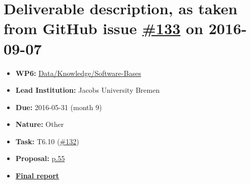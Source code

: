 \section*{\texorpdfstring{Deliverable description, as taken from GitHub
issue
\href{https://github.com/OpenDreamKit/OpenDreamKit/issues/133}{\#133} on
2016-09-07}{Deliverable description, as taken from GitHub issue \#133 on 2016-09-07}}\label{deliverable-description-as-taken-from-github-issues-133-on-2016-09-07}

\begin{itemize}
\tightlist
\item
  \textbf{WP6:}
  \href{https://github.com/OpenDreamKit/OpenDreamKit/tree/master/WP6}{Data/Knowledge/Software-Bases}
\item
  \textbf{Lead Institution:} Jacobs University Bremen
\item
  \textbf{Due:} 2016-05-31 (month 9)
\item
  \textbf{Nature:} Other
\item
  \textbf{Task:} T6.10
  (\href{https://github.com/OpenDreamKit/OpenDreamKit/issues/132}{\#132})
\item
  \textbf{Proposal:}
  \href{https://github.com/OpenDreamKit/OpenDreamKit/raw/master/Proposal/proposal-www.pdf}{p.55}
\item
  \textbf{\href{https://github.com/OpenDreamKit/OpenDreamKit/raw/master/WP6/D6.1/report-final.pdf}{Final
  report}}
\end{itemize}
